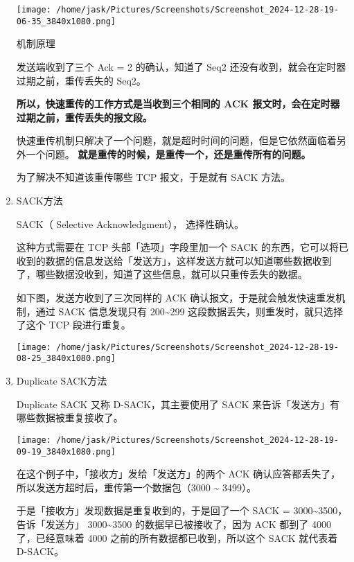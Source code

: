 \documentclass[11pt]{article}
\begin{document}
\begin{enumerate}
\begin{center}
\texttt{[image: /home/jask/Pictures/Screenshots/Screenshot\_2024-12-28-19-06-35\_3840x1080.png]}
\end{center}
机制原理

发送端收到了三个 Ack = 2 的确认，知道了 Seq2 还没有收到，就会在定时器过期之前，重传丢失的 Seq2。

\textbf{所以，快速重传的工作方式是当收到三个相同的 ACK 报文时，会在定时器过期之前，重传丢失的报文段。}

快速重传机制只解决了一个问题，就是超时时间的问题，但是它依然面临着另外一个问题。 \textbf{就是重传的时候，是重传一个，还是重传所有的问题。}

为了解决不知道该重传哪些 TCP 报文，于是就有 SACK 方法。
\item SACK方法
\label{sec:orgd757a93}

SACK（ Selective Acknowledgment）， 选择性确认。

这种方式需要在 TCP 头部「选项」字段里加一个 SACK 的东西，它可以将已收到的数据的信息发送给「发送方」，这样发送方就可以知道哪些数据收到了，哪些数据没收到，知道了这些信息，就可以只重传丢失的数据。

如下图，发送方收到了三次同样的 ACK 确认报文，于是就会触发快速重发机制，通过 SACK 信息发现只有 200\textasciitilde{}299 这段数据丢失，则重发时，就只选择了这个 TCP 段进行重复。
\begin{center}
\texttt{[image: /home/jask/Pictures/Screenshots/Screenshot\_2024-12-28-19-08-25\_3840x1080.png]}
\end{center}
\item Duplicate SACK方法
\label{sec:org5f9c663}

Duplicate SACK 又称 D-SACK，其主要使用了 SACK 来告诉「发送方」有哪些数据被重复接收了。

\begin{center}
\texttt{[image: /home/jask/Pictures/Screenshots/Screenshot\_2024-12-28-19-09-19\_3840x1080.png]}
\end{center}

在这个例子中，「接收方」发给「发送方」的两个 ACK 确认应答都丢失了，所以发送方超时后，重传第一个数据包（3000 \textasciitilde{} 3499）。

于是「接收方」发现数据是重复收到的，于是回了一个 SACK = 3000\textasciitilde{}3500，告诉「发送方」 3000\textasciitilde{}3500 的数据早已被接收了，因为 ACK 都到了 4000 了，已经意味着 4000 之前的所有数据都已收到，所以这个 SACK 就代表着 D-SACK。


\end{enumerate}
\end{document}
